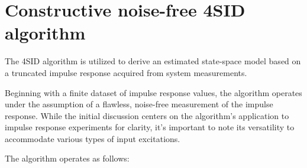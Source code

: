 \section{Constructive noise-free 4SID algorithm}

The 4SID algorithm is utilized to derive an estimated state-space model based on a truncated impulse response acquired from system measurements.

Beginning with a finite dataset of impulse response values, the algorithm operates under the assumption of a flawless, noise-free measurement of the impulse response. 
While the initial discussion centers on the algorithm's application to impulse response experiments for clarity, it's important to note its versatility to accommodate various types of input excitations.

The algorithm operates as follows:
